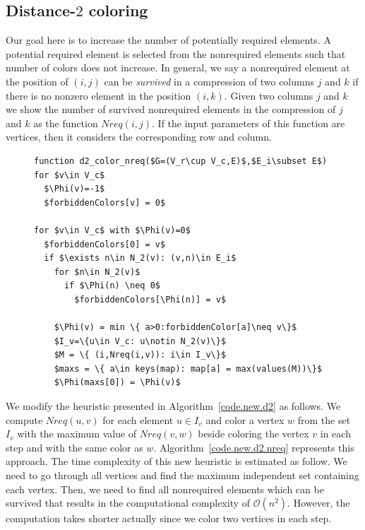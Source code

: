 \documentclass[11pt, twoside,a4paper]{book}
\newcommand{\coderef}[1]{Algorithm~\protect\ref{#1}}
\begin{document}
\subsection{Distance-$2$ coloring}

Our goal here is to increase the number of potentially required elements.
A potential required element is selected from the nonrequired elements such that
number of colors does not increase.
In general, we say a nonrequired element at the position of $(i,j)$
can be \textit{survived} in a compression of two columns $j$ and $k$
if there is no nonzero element in the position $(i,k)$.
Given two columns $j$ and $k$
we show the number of survived nonrequired elements in the compression of
$j$ and $k$ as the function $Nreq(i,j)$.
If the input parameters of this function are vertices,
then it considers the corresponding row and column.
\begin{figure}
\begin{lstlisting}[caption=New coloring heuristic for distance-$2$ coloring
considering the nonrequired elements.,label=code.new.d2.nreq,mathescape]
function d2_color_nreq($G=(V_r\cup V_c,E)$,$E_i\subset E$)
for $v\in V_c$
  $\Phi(v)=-1$
  $forbiddenColors[v] = 0$

for $v\in V_c$ with $\Phi(v)=0$
  $forbiddenColors[0] = v$
  if $\exists n\in N_2(v): (v,n)\in E_i$
    for $n\in N_2(v)$
      if $\Phi(n) \neq 0$
        $forbiddenColors[\Phi(n)] = v$

    $\Phi(v) = min \{ a>0:forbiddenColor[a]\neq v\}$
    $I_v=\{u\in V_c: u\notin N_2(v)\}$
    $M = \{ (i,Nreq(i,v)): i\in I_v\}$
    $maxs = \{ a\in keys(map): map[a] = max(values(M))\}$
    $\Phi(maxs[0]) = \Phi(v)$
\end{lstlisting}
\end{figure}
We modify the heuristic presented in \coderef{code.new.d2} as follows.
We compute $Nreq(u,v)$ for each element $u\in I_v$
and color a vertex $w$ from the set $I_v$ with the maximum value of $Nreq(v,w)$
beside coloring the vertex $v$ in each step and with the same color as $w$.
\coderef{code.new.d2.nreq} represents this approach.
The time complexity of this new heuristic is estimated as follow.
We need to go through all vertices
and find the maximum independent set containing each vertex.
Then, we need to find all nonrequired elements which can be survived
that results in the computational complexity of $\mathcal{O}(n^2)$.
However, the computation takes shorter actually since we color two vertices in each step.
\end{document}
